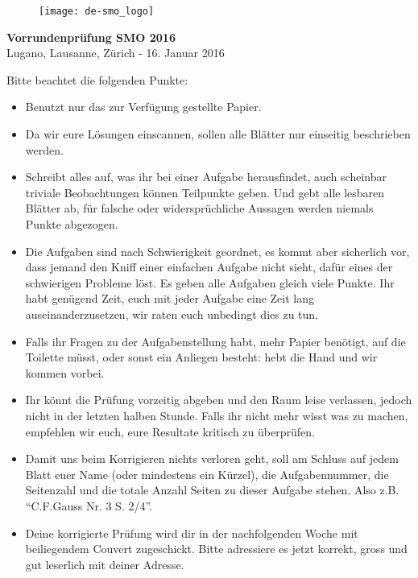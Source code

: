 \documentclass[12pt,a4paper]{article}
\begin{document}
\thispagestyle{empty}
\begin{figure}[h]
\texttt{[image: de-smo\_logo]}
\end{figure}

\vspace{1cm}

\begin{center}
\Huge{\textbf{Vorrundenprüfung SMO 2016}}\\[1.5cm]
\large{Lugano, Lausanne, Zürich - 16. Januar 2016}\\[2.5cm]
\end{center}


Bitte beachtet die folgenden Punkte:

\begin{itemize}
\item Benutzt nur das zur Verfügung gestellte Papier.

\item Da wir eure Lösungen einscannen, sollen alle Blätter nur einseitig beschrieben werden. 

\item Schreibt alles auf, was ihr bei einer Aufgabe herausfindet, auch scheinbar triviale Beobachtungen können Teilpunkte geben. Und gebt alle lesbaren Blätter ab, für falsche oder widersprüchliche Aussagen werden niemals Punkte abgezogen.

\item Die Aufgaben sind nach Schwierigkeit geordnet, es kommt aber sicherlich vor, dass jemand den Kniff einer einfachen Aufgabe nicht sieht, dafür eines der schwierigen Probleme löst. Es geben alle Aufgaben gleich viele Punkte. Ihr habt genügend Zeit, euch mit jeder Aufgabe eine Zeit lang auseinanderzusetzen, wir raten euch unbedingt dies zu tun.

\item Falls ihr Fragen zu der Aufgabenstellung habt, mehr Papier benötigt, auf die Toilette müsst, oder sonst ein Anliegen besteht: hebt die Hand und wir kommen vorbei.

\item Ihr könnt die Prüfung vorzeitig abgeben und den Raum leise verlassen, jedoch nicht in der letzten halben Stunde. Falls ihr nicht mehr wisst was zu machen, empfehlen wir euch, eure Resultate kritisch zu überprüfen.

\item Damit uns beim Korrigieren nichts verloren geht, soll am Schluss auf jedem Blatt euer Name (oder mindestens ein Kürzel), die Aufgabennummer, die Seitenzahl und die totale Anzahl Seiten zu dieser Aufgabe stehen. Also z.B. "`C.F.Gauss Nr. 3 S. 2/4"'.

\item Deine korrigierte Prüfung wird dir in der nachfolgenden Woche mit beiliegendem Couvert zugeschickt. Bitte adressiere es jetzt korrekt, gross und gut leserlich mit deiner Adresse.
\end{itemize}
\end{document}
